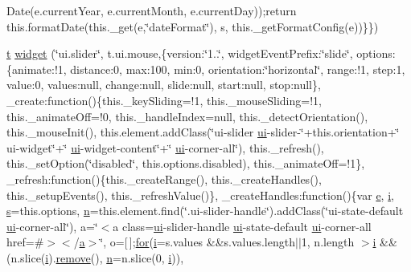 \begin{DoxyCompactItemize}
Date(e.\+current\+Year, e.\+current\+Month, e.\+current\+Day));return this.\+format\+Date(this.\+\_\+get(e,\char`\"{}date\+Format\char`\"{}), s, this.\+\_\+get\+Format\+Config(e))\}\})
\item 
\hyperlink{jquery-ui_8min_8js_acf335ef347969ef6dc8387e680fb289e}{t} \hyperlink{jquery-ui_8min_8js_a583de2e05fddf3b81ff89a3332cffb0d}{widget} (\char`\"{}ui.\+slider\char`\"{}, t.\+ui.\+mouse,\{version\+:\char`\"{}1..\char`\"{}, widget\+Event\+Prefix\+:\char`\"{}slide\char`\"{}, options\+:\{animate\+:!1, distance\+:0, max\+:100, min\+:0, orientation\+:\char`\"{}horizontal\char`\"{}, range\+:!1, step\+:1, value\+:0, values\+:null, change\+:null, slide\+:null, start\+:null, stop\+:null\}, \+\_\+create\+:function()\{this.\+\_\+key\+Sliding=!1, this.\+\_\+mouse\+Sliding=!1, this.\+\_\+animate\+Off=!0, this.\+\_\+handle\+Index=null, this.\+\_\+detect\+Orientation(), this.\+\_\+mouse\+Init(), this.\+element.\+add\+Class(\char`\"{}ui-\/slider \hyperlink{jquery-ui_8min_8js_a8ebc3a47bff7b1c2623695f3db4c0761}{ui}-\/slider-\/\char`\"{}+this.\+orientation+\char`\"{} ui-\/widget\char`\"{}+\char`\"{} \hyperlink{jquery-ui_8min_8js_a8ebc3a47bff7b1c2623695f3db4c0761}{ui}-\/widget-\/content\char`\"{}+\char`\"{} \hyperlink{jquery-ui_8min_8js_a8ebc3a47bff7b1c2623695f3db4c0761}{ui}-\/corner-\/all\char`\"{}), this.\+\_\+refresh(), this.\+\_\+set\+Option(\char`\"{}disabled\char`\"{}, this.\+options.\+disabled), this.\+\_\+animate\+Off=!1\}, \+\_\+refresh\+:function()\{this.\+\_\+create\+Range(), this.\+\_\+create\+Handles(), this.\+\_\+setup\+Events(), this.\+\_\+refresh\+Value()\}, \+\_\+create\+Handles\+:function()\{var \hyperlink{jquery-ui_8min_8js_abea95a4e94bc6f4151d5683d4c12c3f4}{e}, \hyperlink{jquery-ui_8min_8js_a83e0f8a79d7f496783fc7527db51773e}{i}, \hyperlink{paste_2plugin_8min_8js_a43ae144ee2a4e493fea41ca42f795b14}{s}=this.\+options, \hyperlink{fullpage_2plugin_8min_8js_ab767a859d1217315f42c9bb52fc648dc}{n}=this.\+element.\+find(\char`\"{}.ui-\/slider-\/handle\char`\"{}).add\+Class(\char`\"{}ui-\/state-\/default \hyperlink{jquery-ui_8min_8js_a8ebc3a47bff7b1c2623695f3db4c0761}{ui}-\/corner-\/all\char`\"{}), a=\char`\"{}$<$a class=\textquotesingle{}\hyperlink{jquery-ui_8min_8js_a8ebc3a47bff7b1c2623695f3db4c0761}{ui}-\/slider-\/handle \hyperlink{jquery-ui_8min_8js_a8ebc3a47bff7b1c2623695f3db4c0761}{ui}-\/state-\/default \hyperlink{jquery-ui_8min_8js_a8ebc3a47bff7b1c2623695f3db4c0761}{ui}-\/corner-\/all\textquotesingle{} href=\textquotesingle{}\#\textquotesingle{}$>$$<$/\hyperlink{_chart_8min_8js_aef3b685c08bc6c76c8e729bd0e93901d}{a}$>$\char`\"{}, o=\mbox{[}$\,$\mbox{]};\hyperlink{jquery-ui_8min_8js_a75bc805cf26ad48d8e8a98f5af2c3e76}{for}(\hyperlink{jquery-ui_8min_8js_a83e0f8a79d7f496783fc7527db51773e}{i}=s.\+values \&\&s.\+values.\+length$\vert$$\vert$1, n.\+length $>$\hyperlink{jquery-ui_8min_8js_a83e0f8a79d7f496783fc7527db51773e}{i} \&\&(n.\+slice(\hyperlink{jquery-ui_8min_8js_a83e0f8a79d7f496783fc7527db51773e}{i}).\hyperlink{fullpage_2plugin_8min_8js_a3fe72a3812c61d06ea7c5cf2052f3dd2}{remove}(), \hyperlink{fullpage_2plugin_8min_8js_ab767a859d1217315f42c9bb52fc648dc}{n}=n.\+slice(0, \hyperlink{jquery-ui_8min_8js_a83e0f8a79d7f496783fc7527db51773e}{i})), $$
\end{DoxyCompactItemize}
